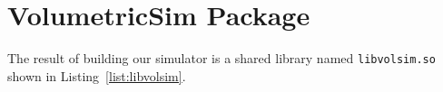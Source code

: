\section{VolumetricSim Package}
The result of building our simulator is a shared library named \texttt{libvolsim.so} shown in Listing~\ref{list:libvolsim}.
